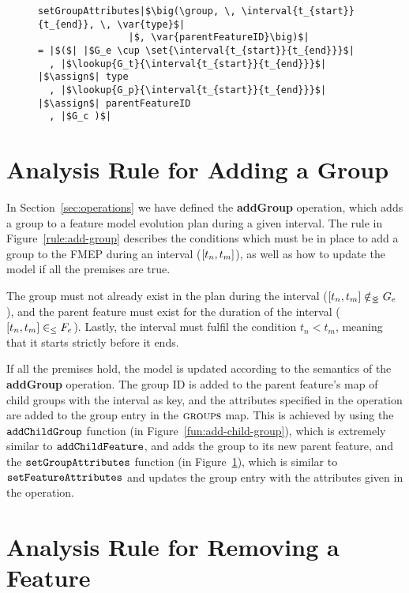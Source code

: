 \begin{figure}[hpbt]
  \begin{verbatim}
setGroupAttributes|$\big(\group, \, \interval{t_{start}}{t_{end}}, \, \var{type}$|
                |$, \var{parentFeatureID}\big)$|
= |$($| |$G_e \cup \set{\interval{t_{start}}{t_{end}}}$|
  , |$\lookup{G_t}{\interval{t_{start}}{t_{end}}}$| |$\assign$| type
  , |$\lookup{G_p}{\interval{t_{start}}{t_{end}}}$| |$\assign$| parentFeatureID
  , |$G_c )$|
  \end{verbatim}
  \caption{}
  \label{fun:set-group-attributes}
\end{figure}

\newpage
\section{Analysis Rule for Adding a Group}
\label{sec:add-group-rule}
In Section~\ref{sec:operations} we have defined the \textbf{addGroup} operation, which adds a group to a feature model evolution plan during a given interval. The rule in Figure~\ref{rule:add-group} describes the conditions which must be in place to add a group to the FMEP during an interval ($\interval{t_n}{t_m}$), as well as how to update the model if all the premises are true.

The group must not already exist in the plan during the interval ($\interval{t_n}{t_m} \notinnr G_e$), and the parent feature must exist for the duration of the interval ($\interval{t_n}{t_m} \inn F_e$). Lastly, the interval must fulfil the condition $t_n < t_m$, meaning that it starts strictly before it ends. 

If all the premises hold, the model is updated according to the semantics of the \textbf{addGroup} operation. The group ID is added to the parent feature's map of child groups with the interval as key, and the attributes specified in the operation are added to the group entry in the $\textsc{groups}{}$ map. This is achieved by using the $\texttt{add\-Child\-Group}$ function (in Figure~\ref{fun:add-child-group}), which is extremely similar to $\texttt{add\-Child\-Feature}$, and adds the group to its new parent feature, and the $\texttt{set\-Group\-Attributes}$ function (in Figure~\ref{fun:set-group-attributes}), which is similar to $\texttt{set\-Feature\-Attributes}$ and updates the group entry with the attributes given in the operation.

\section{Analysis Rule for Removing a Feature}
\label{sec:remove-feature-rule}

